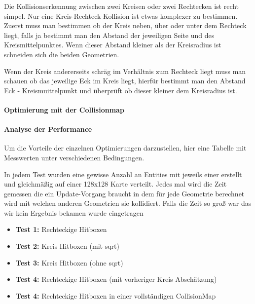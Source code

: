 Die Kollisionserkennung zwischen zwei Kreisen oder zwei Rechtecken ist recht simpel. Nur eine Kreis-Rechteck Kollision ist etwas komplexer zu bestimmen.
Zuerst muss man bestimmen ob der Kreis neben, über oder unter dem Rechteck liegt, falls ja bestimmt man den Abstand der jeweiligen Seite und des Kreismittelpunktes. Wenn dieser Abstand kleiner als der Kreisradius ist schneiden sich die beiden Geometrien.


Wenn der Kreis andererseits schräg im Verhältnis zum Rechteck liegt muss man schauen ob das jeweilige Eck im Kreis liegt, hierfür bestimmt man den Abstand Eck - Kreismuittelpunkt und überprüft ob dieser kleiner dem Kreisradius ist.


\paragraph{Optimierung mit der Collisionmap}


\paragraph{Analyse der Performance}

Um die Vorteile der einzelnen Optimierungen darzustellen, hier eine Tabelle mit Messwerten unter verschiedenen Bedingungen.

In jedem Test wurden eine gewisse Anzahl an Entities mit jeweils einer  erstellt und gleichmäßig auf einer 128x128 Karte verteilt.
Jedes mal wird die Zeit gemessen die ein Update-Vorgang braucht in dem für jede Geometrie berechnet wird mit welchen anderen Geometrien sie kollidiert. Falls die Zeit so groß war das wir kein Ergebnis bekamen wurde  eingetragen

\begin{itemize}
\item{\bf{Test 1}:} Rechteckige Hitboxen
\item{\bf{Test 2}:} Kreis Hitboxen (mit sqrt)
\item{\bf{Test 3}:} Kreis Hitboxen (ohne sqrt) 
\item{\bf{Test 4}:} Rechteckige Hitboxen (mit vorheriger Kreis Abschätzung)
\item{\bf{Test 4}:} Rechteckige Hitboxen in einer vollständigen CollisionMap 
\end{itemize}



